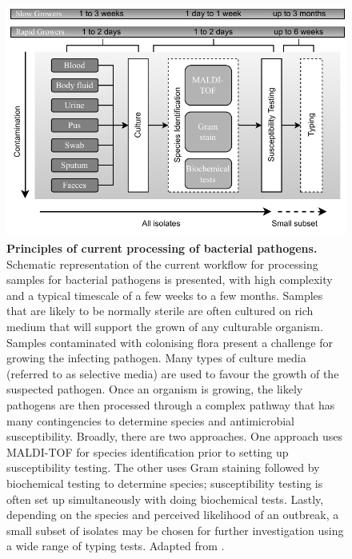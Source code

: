 \begin{figure}[h!]
\centering
\includegraphics[width=\textwidth]{figures/introduction/Figure 2.pdf}
\caption{\textbf{Principles of current processing of bacterial pathogens.} Schematic representation of the current workflow for processing samples for bacterial pathogens is presented, with high complexity and a typical timescale of a few weeks to a few months. Samples that are likely to be normally sterile are often cultured on rich medium that will support the grown of any culturable organism. Samples contaminated with colonising flora present a challenge for growing the infecting pathogen. Many types of culture media (referred to as selective media) are used to favour the growth of the suspected pathogen.
Once an organism is growing, the likely pathogens are then processed through a complex pathway that has many contingencies to determine species and antimicrobial susceptibility. Broadly, there are two approaches. One approach uses MALDI-TOF for species identification prior to setting up susceptibility testing. The other uses Gram staining followed by biochemical testing to determine species; susceptibility testing is often set up simultaneously with doing biochemical tests. Lastly, depending on the species and perceived likelihood of an outbreak, a small subset of isolates may be chosen for further investigation using a wide range of typing tests. Adapted from \cite{didelot_transforming_2012}.}
\label{fig:figure2}
\end{figure}

